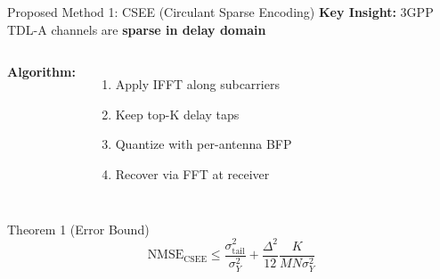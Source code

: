 \documentclass[aspectratio=169]{beamer}
\begin{document}
\begin{frame}{Proposed Method 1: CSEE (Circulant Sparse Encoding)}
\textbf{Key Insight:} 3GPP TDL-A channels are \textbf{sparse in delay domain}

\begin{columns}
\textbf{Algorithm:}
\begin{enumerate}
    \item Apply IFFT along subcarriers
    \item Keep top-K delay taps
    \item Quantize with per-antenna BFP
    \item Recover via FFT at receiver
\end{enumerate}

\end{columns}

\vspace{0.3cm}
\begin{block}{Theorem 1 (Error Bound)}
\vspace{-0.3cm}
\begin{equation*}
\text{NMSE}_{\text{CSEE}} \leq \frac{\sigma_{\text{tail}}^2}{\sigma_Y^2} + \frac{\Delta^2}{12}\frac{K}{MN\sigma_Y^2}
\end{equation*}
\end{block}
\end{frame}
\end{document}
